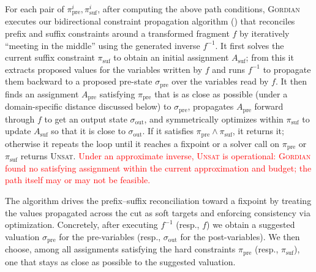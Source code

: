 \documentclass[acmsmall,screen,nonacm]{acmart}
\newcommand{\rev}[1]{\textcolor{red}{#1}}
\newcommand{\rev}[1]{#1}
\newcommand{\projName}{\textsc{Gordian}\xspace}
\theoremstyle{definition}
\begin{document}
For each pair of $\pi_\mathrm{pre}^i, \pi_\mathrm{suf}^i$, after computing the above path conditions, \projName executes our bidirectional constraint propagation algorithm () that reconciles prefix and suffix constraints around a transformed fragment \(f\) by iteratively ``meeting in the middle'' using the generated inverse \(f^{-1}\). It first solves the current suffix constraint \(\pi_{\mathrm{suf}}\) to obtain an initial assignment \(A_{\mathrm{suf}}\); from this it extracts proposed values for the variables written by \(f\) and runs \(f^{-1}\) to propagate them backward to a proposed pre-state \(\sigma_{\mathrm{pre}}\) over the variables read by \(f\). It then finds an assignment \(A_{\mathrm{pre}}\) satisfying \(\pi_{\mathrm{pre}}\) that is as close as possible (under a domain-specific distance discussed below) to \(\sigma_{\mathrm{pre}}\), propagates \(A_{\mathrm{pre}}\) forward through \(f\) to get an output state \(\sigma_{\mathrm{out}}\), and symmetrically optimizes within \(\pi_{\mathrm{suf}}\) to update \(A_{\mathrm{suf}}\) so that it is close to \(\sigma_{\mathrm{out}}\). If it satisfies \(\pi_{\mathrm{pre}}\wedge\pi_{\mathrm{suf}}\), it returns it; otherwise it repeats the loop until it reaches a fixpoint or a solver call on \(\pi_{\mathrm{pre}}\) or \(\pi_{\mathrm{suf}}\) returns \textsc{Unsat}. 
\rev{Under an approximate inverse, \textsc{Unsat} is operational: \projName{} found no satisfying assignment within the current approximation and budget; the path itself may or may not be feasible.}

The algorithm drives the prefix--suffix reconciliation toward a fixpoint by treating the values propagated across the cut as soft targets and enforcing consistency via optimization. Concretely, after executing \(f^{-1}\) (resp., \(f\)) we obtain a suggested valuation \(\sigma_{\mathrm{pre}}\) for the pre-variables (resp., \(\sigma_{\mathrm{out}}\) for the post-variables). We then choose, among all assignments satisfying the hard constraints \(\pi_{\mathrm{pre}}\) (resp., \(\pi_{\mathrm{suf}}\)), one that stays as close as possible to the suggested valuation.
\end{document}
